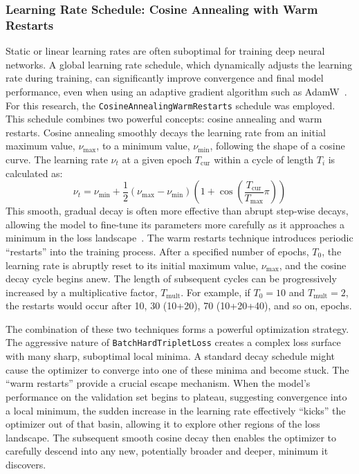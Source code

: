\subsubsection{Learning Rate Schedule: Cosine Annealing with Warm Restarts}
Static or linear learning rates are often suboptimal for training deep neural networks. A global learning rate schedule, which dynamically adjusts the learning rate during training, can significantly improve convergence and final model performance, even when using an adaptive gradient algorithm such as AdamW~\cite{loshchilov2019decoupledweightdecayregularization}. For this research, the \verb|CosineAnnealingWarmRestarts| schedule was employed. This schedule combines two powerful concepts: cosine annealing and warm restarts. Cosine annealing smoothly decays the learning rate from an initial maximum value, \(\nu_{\textrm{max}}\), to a minimum value, \(\nu_{\textrm{min}}\), following the shape of a cosine curve. The learning rate \(\nu_t\) at a given epoch \(T_{\textrm{cur}}\) within a cycle of length \(T_i\) is calculated as:
\[ \nu_t = \nu_{\textrm{min}} + \frac{1}{2}\left( \nu_{\textrm{max}} -\nu_{\textrm{min}} \right)\left(1 + \cos\left(\frac{T_{\textrm{cur}}}{T_{\textrm{max}}}\pi\right)\right) \]
This smooth, gradual decay is often more effective than abrupt step-wise decays, allowing the model to fine-tune its parameters more carefully as it approaches a minimum in the loss landscape~\cite{pytorchcosanneal}.  The warm restarts technique introduces periodic ``restarts'' into the training process. After a specified number of epochs, \(T_0\), the learning rate is abruptly reset to its initial maximum value, \(\nu_{\textrm{max}}\), and the cosine decay cycle begins anew. The length of subsequent cycles can be progressively increased by a multiplicative factor, \(T_{\textrm{mult}}\).  For example, if \(T_0 = 10\) and \(T_{\textrm{mult}}=2\), the restarts would occur after 10, 30 (10+20), 70 (10+20+40), and so on, epochs.

The combination of these two techniques forms a powerful optimization strategy. The aggressive nature of \verb|BatchHardTripletLoss| creates a complex loss surface with many sharp, suboptimal local minima. A standard decay schedule might cause the optimizer to converge into one of these minima and become stuck. The ``warm restarts'' provide a crucial escape mechanism. When the model's performance on the validation set begins to plateau, suggesting convergence into a local minimum, the sudden increase in the learning rate effectively ``kicks'' the optimizer out of that basin, allowing it to explore other regions of the loss landscape. The subsequent smooth cosine decay then enables the optimizer to carefully descend into any new, potentially broader and deeper, minimum it discovers.

